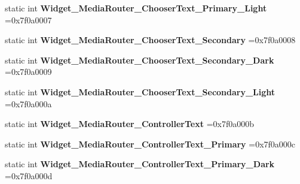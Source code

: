 \begin{DoxyCompactItemize}
static int {\bfseries Widget\+\_\+\+Media\+Router\+\_\+\+Chooser\+Text\+\_\+\+Primary\+\_\+\+Light} =0x7f0a0007
\item 
\mbox{\label{classandroid_1_1support_1_1graphics_1_1drawable_1_1R_1_1style_a4e118b01cbb1a86df88d4644f85f67c9}} 
static int {\bfseries Widget\+\_\+\+Media\+Router\+\_\+\+Chooser\+Text\+\_\+\+Secondary} =0x7f0a0008
\item 
\mbox{\label{classandroid_1_1support_1_1graphics_1_1drawable_1_1R_1_1style_a1eae4aae3331a3e63b796d164387ad88}} 
static int {\bfseries Widget\+\_\+\+Media\+Router\+\_\+\+Chooser\+Text\+\_\+\+Secondary\+\_\+\+Dark} =0x7f0a0009
\item 
\mbox{\label{classandroid_1_1support_1_1graphics_1_1drawable_1_1R_1_1style_ac84b6b8236b11160cba88e7ec20f5659}} 
static int {\bfseries Widget\+\_\+\+Media\+Router\+\_\+\+Chooser\+Text\+\_\+\+Secondary\+\_\+\+Light} =0x7f0a000a
\item 
\mbox{\label{classandroid_1_1support_1_1graphics_1_1drawable_1_1R_1_1style_a66dbf0fd042a8dd08ce462c0d40170c3}} 
static int {\bfseries Widget\+\_\+\+Media\+Router\+\_\+\+Controller\+Text} =0x7f0a000b
\item 
\mbox{\label{classandroid_1_1support_1_1graphics_1_1drawable_1_1R_1_1style_a94954f6f4e3d2fed6405fcc6084cb3b3}} 
static int {\bfseries Widget\+\_\+\+Media\+Router\+\_\+\+Controller\+Text\+\_\+\+Primary} =0x7f0a000c
\item 
\mbox{\label{classandroid_1_1support_1_1graphics_1_1drawable_1_1R_1_1style_a99f4cf4cba2f84dfa6011fbae4b50782}} 
static int {\bfseries Widget\+\_\+\+Media\+Router\+\_\+\+Controller\+Text\+\_\+\+Primary\+\_\+\+Dark} =0x7f0a000d
\item 
\mbox{\label{classandroid_1_1support_1_1graphics_1_1drawable_1_1R_1_1style_afd43e96c8e45e18548598b13d6ea7990}} 

\end{DoxyCompactItemize}
